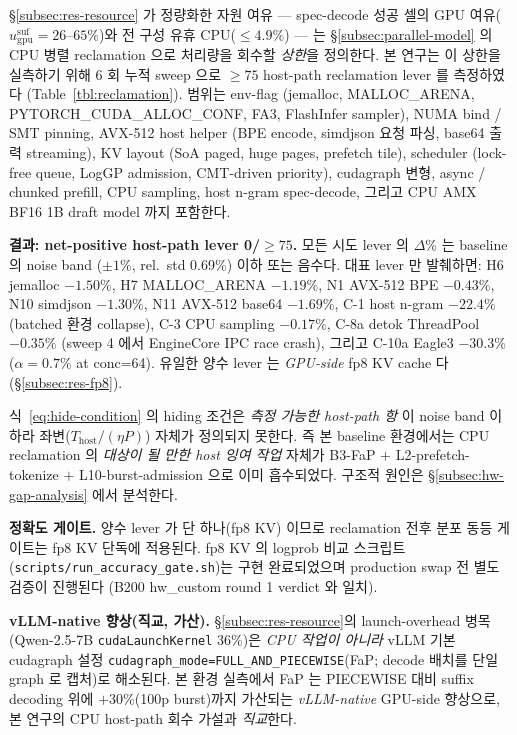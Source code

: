 \S\ref{subsec:res-resource} 가 정량화한 자원 여유 ---
spec-decode 성공 셀의 GPU 여유($u_{\mathrm{gpu}}^{\mathrm{suf}}\!=\!26\text{--}65\%$)와
전 구성 유휴 CPU($\le4.9\%$) --- 는
\S\ref{subsec:parallel-model} 의 CPU 병렬 reclamation 으로 처리량을 회수할 \emph{상한}을 정의한다.
본 연구는 이 상한을 실측하기 위해 6 회 누적 sweep 으로
$\ge\!75$ host-path reclamation lever 를 측정하였다 (Table~\ref{tbl:reclamation}).
범위는 env-flag (jemalloc, MALLOC\_ARENA, PYTORCH\_CUDA\_ALLOC\_CONF, FA3, FlashInfer sampler),
NUMA bind / SMT pinning, AVX-512 host helper (BPE encode, simdjson 요청 파싱, base64 출력 streaming),
KV layout (SoA paged, huge pages, prefetch tile), scheduler (lock-free queue, LogGP admission,
CMT-driven priority), cudagraph 변형, async / chunked prefill, CPU sampling, host n-gram spec-decode,
그리고 CPU AMX BF16 1B draft model 까지 포함한다.

\textbf{결과: net-positive host-path lever 0/$\ge75$.}
모든 시도 lever 의 $\Delta$\% 는 baseline 의 noise band ($\pm1\%$, rel.\ std 0.69\%) 이하 또는 음수다.
대표 lever 만 발췌하면: H6 jemalloc $-1.50\%$, H7 MALLOC\_ARENA $-1.19\%$,
N1 AVX-512 BPE $-0.43\%$, N10 simdjson $-1.30\%$, N11 AVX-512 base64 $-1.69\%$,
C-1 host n-gram $-22.4\%$ (batched 환경 collapse), C-3 CPU sampling $-0.17\%$,
C-8a detok ThreadPool $-0.35\%$ (sweep 4 에서 EngineCore IPC race crash), 그리고
C-10a Eagle3 $-30.3\%$ ($\alpha\!=\!0.7\%$ at conc=64).
유일한 양수 lever 는 \emph{GPU-side} fp8 KV cache 다 (\S\ref{subsec:res-fp8}).

식~\ref{eq:hide-condition} 의 hiding 조건은 \emph{측정 가능한 host-path 항} 이 noise band 이하라
좌변($T_{\mathrm{host}}/(\eta P)$) 자체가 정의되지 못한다.
즉 본 baseline 환경에서는 CPU reclamation 의 \emph{대상이 될 만한 host 잉여 작업} 자체가
B3-FaP $+$ L2-prefetch-tokenize $+$ L10-burst-admission 으로 이미 흡수되었다.
구조적 원인은 \S\ref{subsec:hw-gap-analysis} 에서 분석한다.

\noindent\textbf{정확도 게이트.}
양수 lever 가 단 하나(fp8 KV) 이므로 reclamation 전후 분포 동등 게이트는 fp8 KV 단독에 적용된다.
fp8 KV 의 logprob 비교 스크립트(\texttt{scripts/run\_accuracy\_gate.sh})는 구현 완료되었으며
production swap 전 별도 검증이 진행된다 (B200 hw\_custom round 1 verdict 와 일치).

\noindent\textbf{vLLM-native 향상(직교, 가산).}
\S\ref{subsec:res-resource}의 launch-overhead 병목(Qwen-2.5-7B \texttt{cudaLaunchKernel} 36\%)은
\emph{CPU 작업이 아니라} vLLM 기본 cudagraph 설정
\texttt{cudagraph\_mode=FULL\_AND\_PIECEWISE}(FaP; decode 배치를 단일 graph 로 캡처)로 해소된다.
본 환경 실측에서 FaP 는 PIECEWISE 대비 suffix decoding 위에 \textbf{$+30\%$}(100p burst)까지
가산되는 \emph{vLLM-native} GPU-side 향상으로, 본 연구의 CPU host-path 회수 가설과 \emph{직교}한다.


